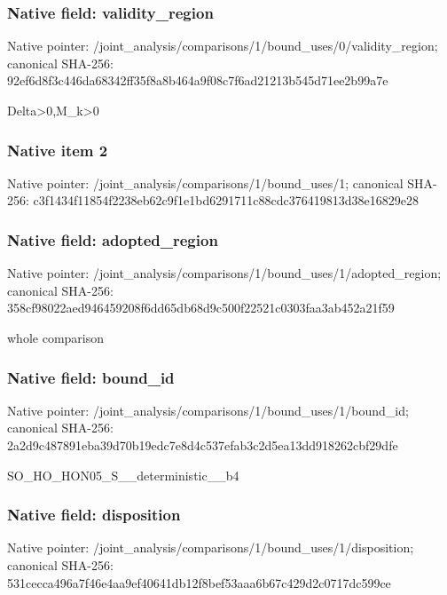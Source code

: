 \documentclass[10pt,a4paper]{article}
\begin{document}
\subsubsection{Native field: validity\_\allowbreak{}region}
Native pointer: /joint\_\allowbreak{}analysis/comparisons/1/bound\_\allowbreak{}uses/0/validity\_\allowbreak{}region; canonical SHA-256: 92ef6d8f3c446da68342ff35f8a8b464a9f08c7f6ad21213b545d71ee2b99a7e

\begingroup\raggedright\sloppy Delta>0,\allowbreak{}M\_\allowbreak{}k>0\par\endgroup

\subsubsection{Native item 2}
Native pointer: /joint\_\allowbreak{}analysis/comparisons/1/bound\_\allowbreak{}uses/1; canonical SHA-256: c3f1434f11854f2238eb62c9f1e1bd6291711c88cdc376419813d38e16829e28

\subsubsection{Native field: adopted\_\allowbreak{}region}
Native pointer: /joint\_\allowbreak{}analysis/comparisons/1/bound\_\allowbreak{}uses/1/adopted\_\allowbreak{}region; canonical SHA-256: 358cf98022aed946459208f6dd65db68d9c500f22521c0303faa3ab452a21f59

\begingroup\raggedright\sloppy whole comparison\par\endgroup

\subsubsection{Native field: bound\_\allowbreak{}id}
Native pointer: /joint\_\allowbreak{}analysis/comparisons/1/bound\_\allowbreak{}uses/1/bound\_\allowbreak{}id; canonical SHA-256: 2a2d9c487891eba39d70b19edc7e8d4c537efab3c2d5ea13dd918262cbf29dfe

\begingroup\raggedright\sloppy SO\_\allowbreak{}HO\_\allowbreak{}HON05\_\allowbreak{}S\_\allowbreak{}\_\allowbreak{}deterministic\_\allowbreak{}\_\allowbreak{}b4\par\endgroup

\subsubsection{Native field: disposition}
Native pointer: /joint\_\allowbreak{}analysis/comparisons/1/bound\_\allowbreak{}uses/1/disposition; canonical SHA-256: 531cecca496a7f46e4aa9ef40641db12f8bef53aaa6b67c429d2c0717dc599ce
\end{document}
